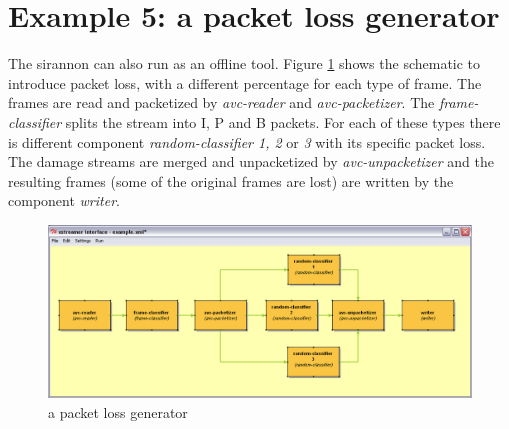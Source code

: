 \documentclass[12pt]{report}
\begin{document}
\section{Example 5: a packet loss generator}
The sirannon can also run as an offline tool. Figure \ref{fig:ex:5} shows the schematic to introduce packet loss, with a different percentage for each type of frame. The frames are read and packetized by \textit{avc-reader} and \textit{avc-packetizer}. The \textit{frame-classifier} splits the stream into I, P and B packets. For each of these types there is different component \textit{random-classifier 1, 2} or \textit{3} with its specific packet loss. The damage streams are merged and unpacketized by \textit{avc-unpacketizer} and the resulting frames (some of the original frames are lost) are written by the component \textit{writer}.
\begin{center}
\begin{figure}[!ht]
	\includegraphics[width=1.0\textwidth]{./images/ex05.png}
	\caption{a packet loss generator}
	\label{fig:ex:5}
\end{figure}
\end{center}
\newpage
\end{document}
